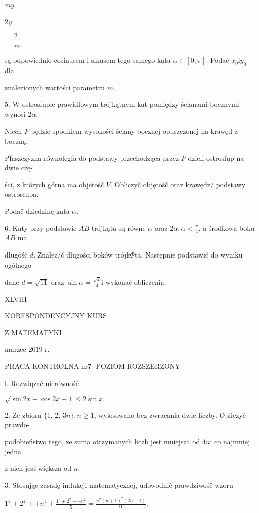 \documentclass[a4paper,12pt]{article}
\begin{document}
{\it my}

2{\it y}

$=2$

$=m$

są odpowiednio cosinusem $\mathrm{i}$ sinusem tego samego kąta $\alpha \in [0,\pi]$. Podač $x_{0} \mathrm{i} y_{0}$ dla

znalezionych wartości parametru $m.$

5. $\mathrm{W}$ ostrosfupie prawidfowym trójkątnym kąt pomiędzy ścianami bocznymi wynosi $2\alpha.$

Niech $P$ będzie spodkiem wysokości ściany bocznej opuszczonej na krawęd $\acute{\mathrm{z}}$ boczną.

Pfaszczyzna równolegfa do podstawy przechodząca przez $P$ dzieli ostrosfup na dwie czę-

ści, $\mathrm{z}$ których górna ma objetośč $V$. Obliczyč objętośč oraz krawędz/ podstawy ostrosłupa.

Podač dziedzinę kąta $\alpha.$

6. Kąty przy podstawie $AB$ trójkąta sq równe $\alpha$ oraz $2\alpha, \displaystyle \alpha<\frac{\pi}{4}$, a środkowa boku $AB$ ma

dlugośč $d$. Znalez/č dlugości boków trójk$\Phi$ta. Następnie podstawič do wyniku ogólnego

dane $d=\sqrt{11}$ oraz $\displaystyle \sin\alpha=\frac{\sqrt{2}}{4}\mathrm{i}$ wykonač obliczenia.




XLVIII

KORESPONDENCYJNY KURS

Z MATEMATYKI

marzec 2019 r.

PRACA KONTROLNA $\mathrm{n}\mathrm{r} 7$- POZIOM ROZSZERZONY

l. Rozwiqzač nierównośč

$\sqrt{\sin 2x-\cos 2x+1}\leq 2\sin x.$

2. Ze zbioru $\{$1, 2, $3n\}, n\geq 1$, wylosowano bez zwracania dwie liczby. Obliczyč prawdo-

podobieństwo tego, $\dot{\mathrm{z}}\mathrm{e}$ suma otrzymanych liczb jest mniejsza od $4n\mathrm{i}$ co najmniej jedna

$\mathrm{z}$ nich jest większa od $n.$

3. Stosując zasadę indukcji matematycznej, udowodnič prawdziwośč wzoru

$1^{4}+2^{4}++n^{4}+\displaystyle \frac{1^{2}+2^{2}++n^{2}}{5}=\frac{n^{2}(n+1)^{2}(2n+1)}{10},$
\end{document}
